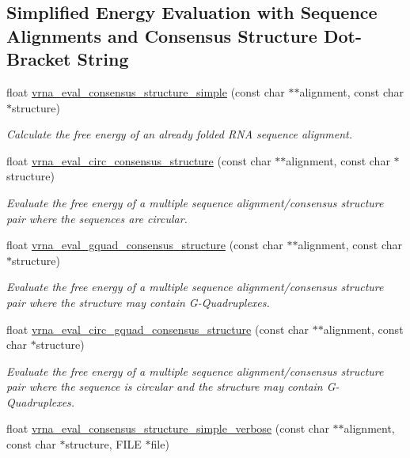 \subsection*{Simplified Energy Evaluation with Sequence Alignments and Consensus Structure Dot-\/\+Bracket String}
\begin{DoxyCompactItemize}
\item 
float \mbox{\hyperlink{group__eval_ga7762c3a7bdcbc3a14ef93259d322c7d6}{vrna\+\_\+eval\+\_\+consensus\+\_\+structure\+\_\+simple}} (const char $\ast$$\ast$alignment, const char $\ast$structure)
\begin{DoxyCompactList}\small\item\em Calculate the free energy of an already folded R\+NA sequence alignment. \end{DoxyCompactList}\item 
float \mbox{\hyperlink{group__eval_gac96577cf232c71160f762737a994b7c6}{vrna\+\_\+eval\+\_\+circ\+\_\+consensus\+\_\+structure}} (const char $\ast$$\ast$alignment, const char $\ast$structure)
\begin{DoxyCompactList}\small\item\em Evaluate the free energy of a multiple sequence alignment/consensus structure pair where the sequences are circular. \end{DoxyCompactList}\item 
float \mbox{\hyperlink{group__eval_gaf09a326b3d57a4b30c27bd0e216198ac}{vrna\+\_\+eval\+\_\+gquad\+\_\+consensus\+\_\+structure}} (const char $\ast$$\ast$alignment, const char $\ast$structure)
\begin{DoxyCompactList}\small\item\em Evaluate the free energy of a multiple sequence alignment/consensus structure pair where the structure may contain G-\/\+Quadruplexes. \end{DoxyCompactList}\item 
float \mbox{\hyperlink{group__eval_gac673ebb9ae2a29f54d201e2ac5b85540}{vrna\+\_\+eval\+\_\+circ\+\_\+gquad\+\_\+consensus\+\_\+structure}} (const char $\ast$$\ast$alignment, const char $\ast$structure)
\begin{DoxyCompactList}\small\item\em Evaluate the free energy of a multiple sequence alignment/consensus structure pair where the sequence is circular and the structure may contain G-\/\+Quadruplexes. \end{DoxyCompactList}\item 
float \mbox{\hyperlink{group__eval_ga1c07851f6b665c3461a19e9e4eb33d26}{vrna\+\_\+eval\+\_\+consensus\+\_\+structure\+\_\+simple\+\_\+verbose}} (const char $\ast$$\ast$alignment, const char $\ast$structure, F\+I\+LE $\ast$file)
$$
\end{DoxyCompactItemize}
